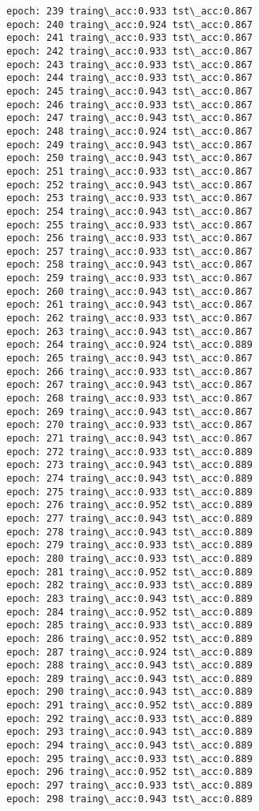 \documentclass[11pt]{article}
\begin{document}
\begin{Verbatim}[commandchars=\\\{\}]
epoch: 239 traing\_acc:0.933 tst\_acc:0.867
epoch: 240 traing\_acc:0.924 tst\_acc:0.867
epoch: 241 traing\_acc:0.933 tst\_acc:0.867
epoch: 242 traing\_acc:0.933 tst\_acc:0.867
epoch: 243 traing\_acc:0.933 tst\_acc:0.867
epoch: 244 traing\_acc:0.933 tst\_acc:0.867
epoch: 245 traing\_acc:0.943 tst\_acc:0.867
epoch: 246 traing\_acc:0.933 tst\_acc:0.867
epoch: 247 traing\_acc:0.943 tst\_acc:0.867
epoch: 248 traing\_acc:0.924 tst\_acc:0.867
epoch: 249 traing\_acc:0.943 tst\_acc:0.867
epoch: 250 traing\_acc:0.943 tst\_acc:0.867
epoch: 251 traing\_acc:0.933 tst\_acc:0.867
epoch: 252 traing\_acc:0.943 tst\_acc:0.867
epoch: 253 traing\_acc:0.933 tst\_acc:0.867
epoch: 254 traing\_acc:0.943 tst\_acc:0.867
epoch: 255 traing\_acc:0.933 tst\_acc:0.867
epoch: 256 traing\_acc:0.933 tst\_acc:0.867
epoch: 257 traing\_acc:0.933 tst\_acc:0.867
epoch: 258 traing\_acc:0.943 tst\_acc:0.867
epoch: 259 traing\_acc:0.933 tst\_acc:0.867
epoch: 260 traing\_acc:0.943 tst\_acc:0.867
epoch: 261 traing\_acc:0.943 tst\_acc:0.867
epoch: 262 traing\_acc:0.933 tst\_acc:0.867
epoch: 263 traing\_acc:0.943 tst\_acc:0.867
epoch: 264 traing\_acc:0.924 tst\_acc:0.889
epoch: 265 traing\_acc:0.943 tst\_acc:0.867
epoch: 266 traing\_acc:0.933 tst\_acc:0.867
epoch: 267 traing\_acc:0.943 tst\_acc:0.867
epoch: 268 traing\_acc:0.933 tst\_acc:0.867
epoch: 269 traing\_acc:0.943 tst\_acc:0.867
epoch: 270 traing\_acc:0.933 tst\_acc:0.867
epoch: 271 traing\_acc:0.943 tst\_acc:0.867
epoch: 272 traing\_acc:0.933 tst\_acc:0.889
epoch: 273 traing\_acc:0.943 tst\_acc:0.889
epoch: 274 traing\_acc:0.943 tst\_acc:0.889
epoch: 275 traing\_acc:0.933 tst\_acc:0.889
epoch: 276 traing\_acc:0.952 tst\_acc:0.889
epoch: 277 traing\_acc:0.943 tst\_acc:0.889
epoch: 278 traing\_acc:0.943 tst\_acc:0.889
epoch: 279 traing\_acc:0.933 tst\_acc:0.889
epoch: 280 traing\_acc:0.933 tst\_acc:0.889
epoch: 281 traing\_acc:0.952 tst\_acc:0.889
epoch: 282 traing\_acc:0.933 tst\_acc:0.889
epoch: 283 traing\_acc:0.943 tst\_acc:0.889
epoch: 284 traing\_acc:0.952 tst\_acc:0.889
epoch: 285 traing\_acc:0.933 tst\_acc:0.889
epoch: 286 traing\_acc:0.952 tst\_acc:0.889
epoch: 287 traing\_acc:0.924 tst\_acc:0.889
epoch: 288 traing\_acc:0.943 tst\_acc:0.889
epoch: 289 traing\_acc:0.943 tst\_acc:0.889
epoch: 290 traing\_acc:0.943 tst\_acc:0.889
epoch: 291 traing\_acc:0.952 tst\_acc:0.889
epoch: 292 traing\_acc:0.933 tst\_acc:0.889
epoch: 293 traing\_acc:0.943 tst\_acc:0.889
epoch: 294 traing\_acc:0.943 tst\_acc:0.889
epoch: 295 traing\_acc:0.933 tst\_acc:0.889
epoch: 296 traing\_acc:0.952 tst\_acc:0.889
epoch: 297 traing\_acc:0.933 tst\_acc:0.889
epoch: 298 traing\_acc:0.943 tst\_acc:0.889

\end{Verbatim}
\end{document}
